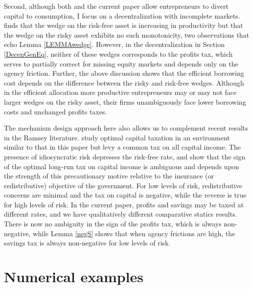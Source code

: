 \documentclass[11pt]{article}
\theoremstyle{plain}
\theoremstyle{definition} %
\begin{document}
Second, although both \cite{shourideh_optimal_2013} and the current paper allow entrepreneurs to divert capital to consumption, I focus on a decentralization with incomplete markets. \cite{shourideh_optimal_2013} finds that the wedge on the risk-free asset is increasing in productivity but that the wedge on the risky asset exhibits no such monotonicity, two observations that echo Lemma \ref{LEMMAwedge}. However, in the decentralization in Section \ref{DecenGenEq}, neither of these wedges corresponds to the profits tax, which serves to partially correct for missing equity markets and depends only on the agency friction. Further, the above discussion shows that the efficient borrowing cost depends on the difference between the risky and risk-free wedges. Although in the efficient allocation more productive entrepreneurs may or may not face larger wedges on the risky asset, their firms unambiguously face lower borrowing costs and unchanged profits taxes. 

The mechanism design approach here also allows us to complement recent results in the Ramsey literature. \cite{panousi_optimal_2012} study optimal capital taxation in an environment similar to that in this paper but levy a common tax on all capital income. The presence of idiosyncratic risk depresses the risk-free rate, and \cite{panousi_optimal_2012} show that the sign of the optimal long-run tax on capital income is ambiguous and depends upon the strength of this precautionary motive relative to the insurance (or redistributive) objective of the government. For low levels of risk, redistributive concerns are minimal and the tax on capital is negative, while the reverse is true for high levels of risk. In the current paper, profits and savings may be taxed at different rates, and we have qualitatively different comparative statics results. There is now no ambiguity in the sign of the profits tax, which is always non-negative, while Lemma \ref{negS} shows that when agency frictions are high, the savings tax is always non-negative for low levels of risk.


\section{Numerical examples}\label{numerical}
\end{document}
